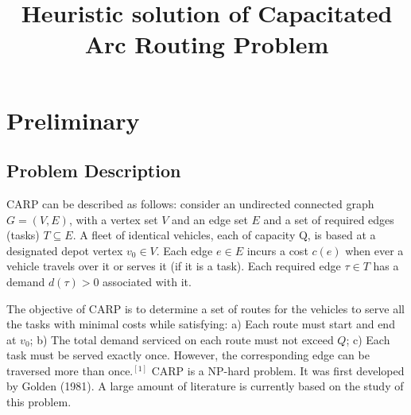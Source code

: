 \documentclass[conference,compsoc]{IEEEtran}
\begin{document}
%
\title{Heuristic solution of Capacitated Arc Routing Problem}


\author{
}

\maketitle
\tableofcontents

\IEEEpeerreviewmaketitle



\section{Preliminary}

\subsection{Problem Description}
CARP can be described as follows: consider an undirected connected graph $G=(V, E)$, with a vertex set $V$ and an edge set $E$ and a set of required edges (tasks) $T \subseteq E$. A fleet of identical vehicles, each of capacity Q, is based at a designated depot vertex $v_0 \in V$. Each edge $e \in E$ incurs a cost $c(e)$ when ever a vehicle travels over it or serves it (if it is a task). Each required edge $\tau \in T$ has a demand $d(\tau) > 0$ associated with it.

The objective of CARP is to determine a set of routes for the vehicles to serve all the tasks with minimal costs while satisfying: a) Each route must start and end at $v_0$; b) The total demand serviced on each route must not exceed $Q$; c) Each task must be served exactly once. However, the corresponding edge can be traversed more than once.$^{[1]}$ CARP is a NP-hard problem. It was first developed by Golden (1981). A large amount of literature is currently based on the study of this problem. 
\end{document}
